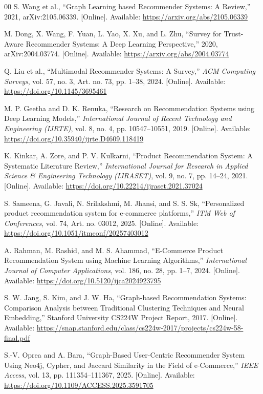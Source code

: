 \documentclass[12pt,a4paper]{report}
\begin{document}
{\begin{thebibliography}{00}
 S. Wang et al., ``Graph Learning based Recommender Systems: A Review,'' 2021, arXiv:2105.06339. [Online]. Available: \url{https://arxiv.org/abs/2105.06339}

 M. Dong, X. Wang, F. Yuan, L. Yao, X. Xu, and L. Zhu, ``Survey for Trust-Aware Recommender Systems: A Deep Learning Perspective,'' 2020, arXiv:2004.03774. [Online]. Available: \url{https://arxiv.org/abs/2004.03774}

 Q. Liu et al., ``Multimodal Recommender Systems: A Survey,'' \textit{ACM Computing Surveys}, vol. 57, no. 3, Art. no. 73, pp. 1--38, 2024. [Online]. Available: \url{https://doi.org/10.1145/3695461}

 M. P. Geetha and D. K. Renuka, ``Research on Recommendation Systems using Deep Learning Models,'' \textit{International Journal of Recent Technology and Engineering (IJRTE)}, vol. 8, no. 4, pp. 10547--10551, 2019. [Online]. Available: \url{https://doi.org/10.35940/ijrte.D4609.118419}

 K. Kinkar, A. Zore, and P. V. Kulkarni, ``Product Recommendation System: A Systematic Literature Review,'' \textit{International Journal for Research in Applied Science \& Engineering Technology (IJRASET)}, vol. 9, no. 7, pp. 14--24, 2021. [Online]. Available: \url{https://doi.org/10.22214/ijraset.2021.37024}

 S. Sameena, G. Javali, N. Srilakshmi, M. Jhansi, and S. S. Sk, ``Personalized product recommendation system for e-commerce platforms,'' \textit{ITM Web of Conferences}, vol. 74, Art. no. 03012, 2025. [Online]. Available: \url{https://doi.org/10.1051/itmconf/20257403012}

 A. Rahman, M. Rashid, and M. S. Ahammad, ``E-Commerce Product Recommendation System using Machine Learning Algorithms,'' \textit{International Journal of Computer Applications}, vol. 186, no. 28, pp. 1--7, 2024. [Online]. Available: \url{https://doi.org/10.5120/ijca2024923795}

 S. W. Jang, S. Kim, and J. W. Ha, ``Graph-based Recommendation Systems: Comparison Analysis between Traditional Clustering Techniques and Neural Embedding,'' Stanford University CS224W Project Report, 2017. [Online]. Available: \url{https://snap.stanford.edu/class/cs224w-2017/projects/cs224w-58-final.pdf}

 S.-V. Oprea and A. Bara, ``Graph-Based User-Centric Recommender System Using {Neo4j}, {Cypher}, and {Jaccard} Similarity in the Field of e-Commerce,'' \textit{IEEE Access}, vol. 13, pp. 111354--111367, 2025. [Online]. Available: \url{https://doi.org/10.1109/ACCESS.2025.3591705}


\end{thebibliography}}
\end{document}
